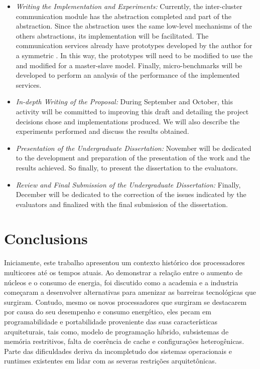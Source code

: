 	\begin{itemize}
		\item \textit{Writing the Implementation and Experiments:}
			Currently, the inter-cluster communication module has the \sync abstraction
			completed and part of the \mailbox abstraction.
			Since the \portal abstraction uses the same low-level mechanisms of the others
			abstractions, its implementation will be facilitated.
			The communication services already have prototypes developed by the author
			for a symmetric \os.
			In this way, the prototypes will need to be modified to use the \hal and
			modified for a master-slave model.
			Finally, micro-benchmarks will be developed to perform an analysis of the
			performance of the implemented services.
		\item \textit{In-depth Writing of the Proposal:}
			During September and October, this activity will be committed to improving
			this draft and detailing the project decisions chose and implementations produced.
			We will also describe the experiments performed and discuss the results obtained.
		\item \textit{Presentation of the Undergraduate Dissertation:}
			November will be dedicated to the development and preparation of the presentation
			of the work and the results achieved.
			So finally, to present the dissertation to the evaluators.
		\item \textit{Review and Final Submission of the Undergraduate Dissertation:}
			Finally, December will be dedicated to the correction of the issues indicated
			by the evaluators and finalized with the final submission of the dissertation.
	\end{itemize}

 \chapter{Conclusions}
\label{ch.conclusions}

Iniciamente, este trabalho apresentou um contexto histórico
dos processadores multicores até os tempos atuais.
Ao demonstrar a relação entre o aumento de núcleos e o consumo
de energia, foi discutido como a academia e a industria
começaram a desenvolver alternativas para amenizar as
barreiras tecnológicas que surgiram.
Contudo, mesmo os novos processadores que surgiram
se destacarem por causa do seu desempenho e consumo energético,
eles pecam em programabilidade e portabilidade proveniente
das suas características arquiteturais, tais como, modelo de
programação híbrido, subsistemas de memória restritivos,
falta de coerência de cache e configurações heterogênicas.
Parte das dificuldades deriva da incompletudo dos sistemas operacionais
e runtimes existentes em lidar com as severas restrições arquitetônicas.

